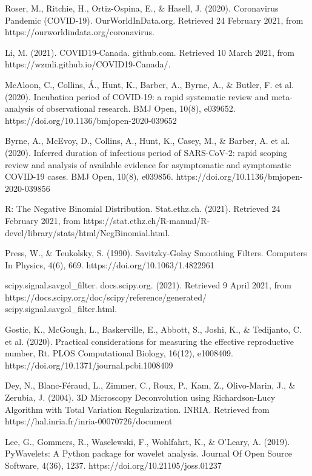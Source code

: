 \documentclass{article}
\begin{document}
\begin{thebibliography}{2}

Roser, M., Ritchie, H., Ortiz-Ospina, E., \& Hasell, J. (2020). Coronavirus Pandemic (COVID-19). OurWorldInData.org. Retrieved 24 February 2021, from https://ourworldindata.org/coronavirus.

Li, M. (2021). COVID19-Canada. github.com. Retrieved 10 March 2021, from https://wzmli.github.io/COVID19-Canada/.


McAloon, C., Collins, Á., Hunt, K., Barber, A., Byrne, A., \& Butler, F. et al. (2020). Incubation period of COVID-19: a rapid systematic review and meta-analysis of observational research. BMJ Open, 10(8), e039652. https://doi.org/10.1136/bmjopen-2020-039652

Byrne, A., McEvoy, D., Collins, A., Hunt, K., Casey, M., \& Barber, A. et al. (2020). Inferred duration of infectious period of SARS-CoV-2: rapid scoping review and analysis of available evidence for asymptomatic and symptomatic COVID-19 cases. BMJ Open, 10(8), e039856. https://doi.org/10.1136/bmjopen-2020-039856

R: The Negative Binomial Distribution. Stat.ethz.ch. (2021). Retrieved 24 February 2021, from https://stat.ethz.ch/R-manual/R-devel/library/stats/html/NegBinomial.html.

Press, W., \& Teukolsky, S. (1990). Savitzky-Golay Smoothing Filters. Computers In Physics, 4(6), 669. https://doi.org/10.1063/1.4822961
    
scipy.signal.savgol\_filter. docs.scipy.org. (2021). Retrieved 9 April 2021, from https://docs.scipy.org/doc/scipy/reference/generated/ scipy.signal.savgol\_filter.html.

Gostic, K., McGough, L., Baskerville, E., Abbott, S., Joshi, K., \& Tedijanto, C. et al. (2020). Practical considerations for measuring the effective reproductive number, Rt. PLOS Computational Biology, 16(12), e1008409. https://doi.org/10.1371/journal.pcbi.1008409

Dey, N., Blanc-Féraud, L., Zimmer, C., Roux, P., Kam, Z., Olivo-Marin, J., \& Zerubia, J. (2004). 3D Microscopy Deconvolution using Richardson-Lucy Algorithm with Total Variation Regularization. INRIA. Retrieved from https://hal.inria.fr/inria-00070726/document

Lee, G., Gommers, R., Waselewski, F., Wohlfahrt, K., \& O'Leary, A. (2019). PyWavelets: A Python package for wavelet analysis. Journal Of Open Source Software, 4(36), 1237. https://doi.org/10.21105/joss.01237


\end{thebibliography}
\end{document}
